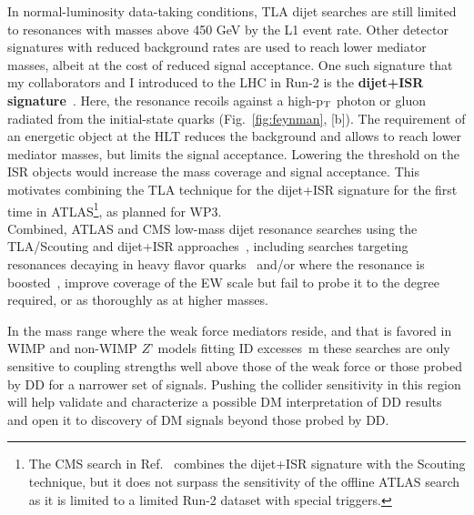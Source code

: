 In normal-luminosity data-taking conditions, TLA dijet searches are still limited to resonances with masses above 450 GeV by the L1 event rate. 
Other detector signatures with reduced background rates are used to reach lower mediator masses, albeit at the cost of reduced signal acceptance.
One such signature that my collaborators and I introduced to the LHC in Run-2 is the \textbf{dijet+ISR signature}~\cite{An:2012ue,Aaboud:2019zxd}. 
Here, the resonance recoils against a high-p$_{\rm{T}}$ photon or gluon radiated from the initial-state quarks (Fig.~\ref{fig:feynman}, [b]). 
The requirement of an energetic object at the HLT reduces the background and allows to reach lower mediator masses, 
but limits the signal acceptance. 
Lowering the threshold on the ISR objects would increase the mass coverage and signal acceptance.
This motivates combining the TLA technique for the dijet+ISR signature for the first time in ATLAS\footnote{The CMS search in Ref.~\cite{Sirunyan:2019pnb} %
combines the dijet+ISR signature with the Scouting technique, but it does not surpass the sensitivity of the offline ATLAS search as it is limited to a limited Run-2 dataset with special triggers.}, as planned for WP3. 
\\
Combined, ATLAS and CMS low-mass dijet resonance searches using the TLA/Scouting and dijet+ISR approaches~\cite{Aaboud:2018fzt,Sirunyan:2019pnb},
including searches targeting resonances decaying in heavy flavor quarks~\cite{EXOT-2016-33,CMS-EXO-16-057} %
and/or where the resonance is boosted~\cite{EXOT-2017-01,CMS-EXO-17-001,Sirunyan:2018ikr,ATLAS-CONF-2018-052,Sirunyan:2019vxa}, %
improve coverage of the EW scale but fail to probe it to the degree required, or as thoroughly as at higher masses.

In the mass range where the weak force mediators reside, and that is favored in WIMP and non-WIMP $Z’$ models fitting ID excesses~\cite{Hooper:2019xss}m %
these searches are only sensitive to coupling strengths well above those of the weak force or those probed by DD for a narrower set of signals.
Pushing the collider sensitivity in this region will help validate and characterize a possible DM interpretation of DD results~\cite{Ellis:2018xal,Kang:2020huh,Alves:2016cqf} and open it to discovery of DM signals beyond those probed by DD.

